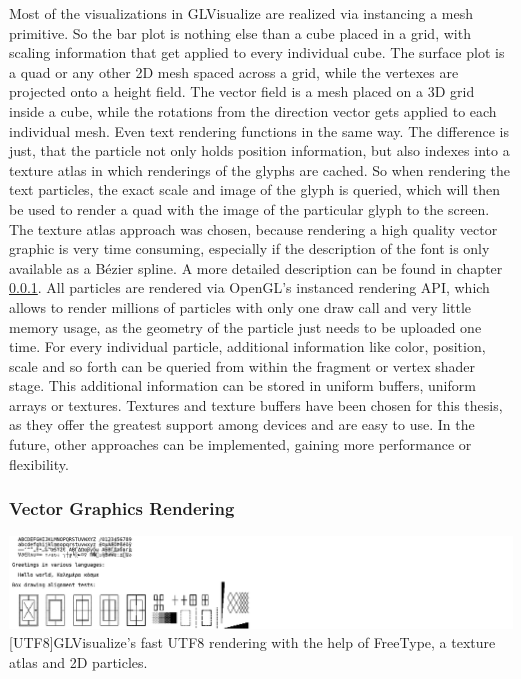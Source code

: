 Most of the visualizations in GLVisualize are realized via instancing a mesh primitive.
So the bar plot is nothing else than a cube placed in a grid, with scaling information that get applied to every individual cube. The surface plot is a quad or any other 2D mesh spaced across a grid, while the vertexes are projected onto a height field. The vector field is a mesh placed on a 3D grid inside a cube, while the rotations from the direction vector gets applied to each individual mesh. 
Even text rendering functions in the same way. The difference is just, that the particle not only holds position information, but also indexes into a texture atlas in which renderings of the glyphs are cached. So when rendering the text particles, the exact scale and image of the glyph is queried, which will then be used to render a quad with the image of the particular glyph to the screen.
The texture atlas approach was chosen, because rendering a high quality vector graphic is very time consuming, especially if the description of the font is only available as a Bézier spline. A more detailed description can be found in chapter \ref{vector rendering}.
All particles are rendered via \ac{OpenGL}'s instanced rendering API, which allows to render millions of particles with only one draw call and very little memory usage, as the geometry of the particle just needs to be uploaded one time.
For every individual particle, additional information like color, position, scale and so forth can be queried from within the fragment or vertex shader stage.
This additional information can be stored in uniform buffers, uniform arrays or textures. Textures and texture buffers have been chosen for this thesis, as they offer the greatest support among devices and are easy to use. In the future, other approaches can be implemented, gaining more performance or flexibility.


\subsubsection{Vector Graphics Rendering}\label{vector rendering}
\vspace{1em}
\begin{minipage}{\linewidth}
    \centering
    \includegraphics[width=0.9\linewidth]{graphics/utf8.png}
    [UTF8]{GLVisualize's fast UTF8 rendering with the help of FreeType, a texture atlas and 2D particles.}
    \label{fig:UTF8}
\end{minipage}

